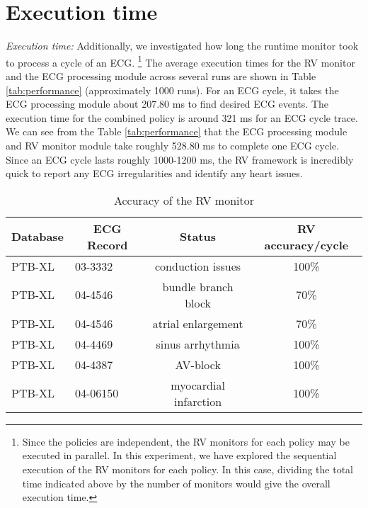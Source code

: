 \section{Execution time}

\textit{Execution time:} Additionally, we investigated how long the runtime monitor took to process a cycle of an ECG. \footnote {Since the policies are independent, the RV monitors for each policy may be executed in parallel. In this experiment, we have explored the sequential execution of the RV monitors for each policy. In this case, dividing the total time indicated above by the number of monitors would give the overall execution time.} The average execution times for the RV monitor and the ECG processing module across several runs are shown in Table \ref{tab:performance} (approximately 1000 runs). For an ECG cycle, it takes the ECG processing module about 207.80 ms to find desired ECG events. The execution time for the combined policy is around 321 ms for an ECG cycle trace. We can see from the Table \ref{tab:performance} that the ECG processing module and RV monitor module take roughly 528.80 ms to complete one ECG cycle. Since an ECG cycle lasts roughly 1000-1200 ms, the RV framework is incredibly quick to report any ECG irregularities and identify any heart issues.
\vspace{-0.5em}
\begin{table}[!htb]
	\begin{minipage}{1\linewidth}
		\centering
		\caption{Accuracy of the RV monitor}
		\vspace{-0.5em}
		\resizebox{1\columnwidth}{!}
		{
			\begin{tabular}{|l|l|c|c|}
				\hline
				\multicolumn{1}{|c|}{Database} & \multicolumn{1}{c|}{ECG Record} & Status              & RV accuracy/cycle  \\ \hline
				PTB-XL                         & 03-3332                     & conduction issues   & 100\%   \\ \hline
				PTB-XL                         & 04-4546                     & bundle branch block & 70\%     \\ \hline
				PTB-XL                         & 04-4546                     & atrial enlargement  & 70\%     \\ \hline
				PTB-XL                        & 04-4469                     & sinus arrhythmia          & 100\%   \\ \hline
				PTB-XL                        & 04-4387                     & AV-block         & 100\%    \\ \hline
				PTB-XL                        & 04-06150                     & myocardial infarction         & 100\%    \\ \hline
			\end{tabular}
		}
		\label{table:accuracy}
	\end{minipage}
\end{table}
